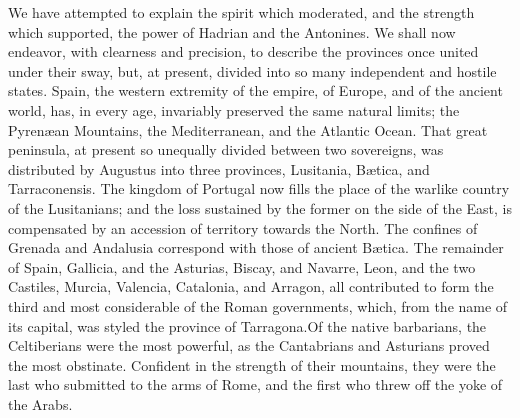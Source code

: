 



We have attempted to explain the spirit which moderated, and the
strength which supported, the power of Hadrian and the Antonines.
We shall now endeavor, with clearness and precision, to describe
the provinces once united under their sway, but, at present,
divided into so many independent and hostile states. Spain, the
western extremity of the empire, of Europe, and of the ancient
world, has, in every age, invariably preserved the same natural
limits; the Pyrenæan Mountains, the Mediterranean, and the
Atlantic Ocean. That great peninsula, at present so unequally
divided between two sovereigns, was distributed by Augustus into
three provinces, Lusitania, Bætica, and Tarraconensis. The
kingdom of Portugal now fills the place of the warlike country of
the Lusitanians; and the loss sustained by the former on the side
of the East, is compensated by an accession of territory towards
the North. The confines of Grenada and Andalusia correspond with
those of ancient Bætica. The remainder of Spain, Gallicia, and
the Asturias, Biscay, and Navarre, Leon, and the two Castiles,
Murcia, Valencia, Catalonia, and Arragon, all contributed to form
the third and most considerable of the Roman governments, which,
from the name of its capital, was styled the province of
Tarragona.\footnotemark[70] Of the native barbarians, the Celtiberians were the
most powerful, as the Cantabrians and Asturians proved the most
obstinate. Confident in the strength of their mountains, they
were the last who submitted to the arms of Rome, and the first
who threw off the yoke of the Arabs.


